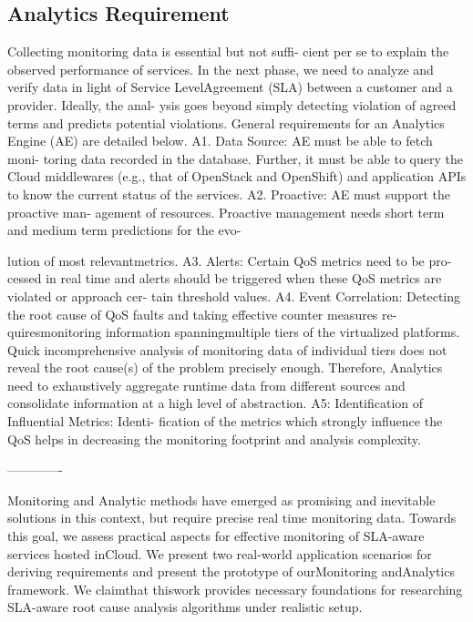 \subsection{Analytics Requirement}

Collecting monitoring data is essential but not suffi- cient per se to explain the observed performance of services. In the next phase, we need to analyze and verify data in light of Service LevelAgreement (SLA) between a customer and a provider. Ideally, the anal- ysis goes beyond simply detecting violation of agreed terms and predicts potential violations. General requirements for an Analytics Engine
(AE) are detailed below. A1. Data Source: AE must be able to fetch moni- toring data recorded in the database. Further, it must be able to query the Cloud middlewares (e.g., that of OpenStack and OpenShift) and application APIs to know the current status of the services. A2. Proactive: AE must support the proactive man- agement of resources. Proactive management needs short term and medium term predictions for the evo-

lution of most relevantmetrics. A3. Alerts: Certain QoS metrics need to be pro- cessed in real time and alerts should be triggered when these QoS metrics are violated or approach cer- tain threshold values. A4. Event Correlation: Detecting the root cause of QoS faults and taking effective counter measures re- quiresmonitoring information spanningmultiple tiers of the virtualized platforms. Quick incomprehensive analysis of monitoring data of individual tiers does not reveal the root cause(s) of the problem precisely enough. Therefore, Analytics need to exhaustively aggregate runtime data from different sources and consolidate information at a high level of abstraction. A5: Identification of Influential Metrics: Identi- fication of the metrics which strongly influence the QoS helps in decreasing the monitoring footprint and analysis complexity.


-------------


Monitoring and Analytic methods have emerged as promising and inevitable solutions in this context, but require precise real time monitoring data. Towards this goal, we assess practical aspects for effective monitoring of SLA-aware services hosted inCloud. We present two real-world application scenarios for deriving requirements and present the prototype of ourMonitoring andAnalytics framework. We claimthat thiswork provides necessary foundations for researching SLA-aware root cause analysis algorithms under realistic setup.

